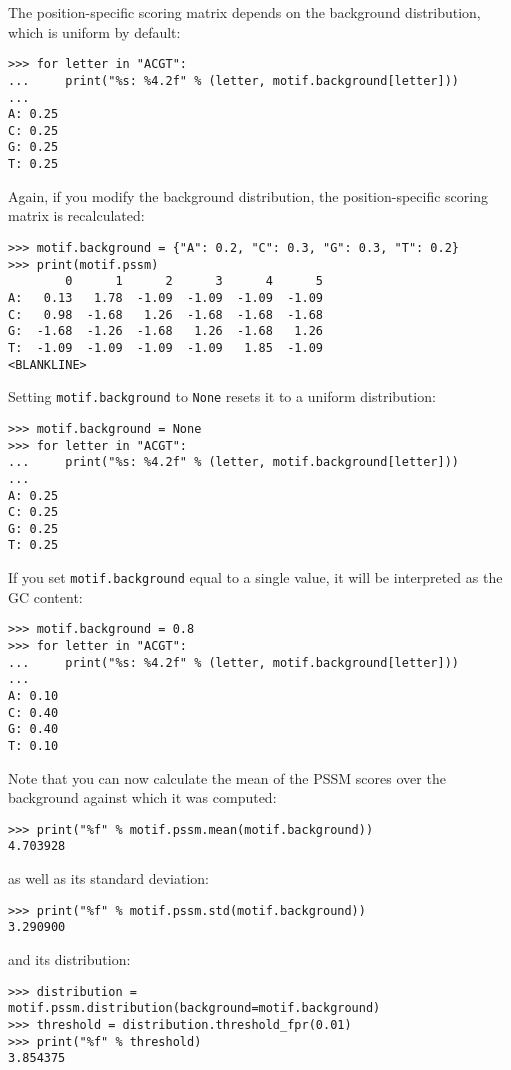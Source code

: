 The position-specific scoring matrix depends on the background distribution, which is uniform by default:

\begin{verbatim}
>>> for letter in "ACGT":
...     print("%s: %4.2f" % (letter, motif.background[letter]))
...
A: 0.25
C: 0.25
G: 0.25
T: 0.25
\end{verbatim}
Again, if you modify the background distribution, the position-specific scoring matrix is recalculated:

\begin{verbatim}
>>> motif.background = {"A": 0.2, "C": 0.3, "G": 0.3, "T": 0.2}
>>> print(motif.pssm)
        0      1      2      3      4      5
A:   0.13   1.78  -1.09  -1.09  -1.09  -1.09
C:   0.98  -1.68   1.26  -1.68  -1.68  -1.68
G:  -1.68  -1.26  -1.68   1.26  -1.68   1.26
T:  -1.09  -1.09  -1.09  -1.09   1.85  -1.09
<BLANKLINE>
\end{verbatim}
Setting \verb+motif.background+ to \verb+None+ resets it to a uniform distribution:

\begin{verbatim}
>>> motif.background = None
>>> for letter in "ACGT":
...     print("%s: %4.2f" % (letter, motif.background[letter]))
...
A: 0.25
C: 0.25
G: 0.25
T: 0.25
\end{verbatim}
If you set \verb+motif.background+ equal to a single value, it will be interpreted as the GC content:

\begin{verbatim}
>>> motif.background = 0.8
>>> for letter in "ACGT":
...     print("%s: %4.2f" % (letter, motif.background[letter]))
...
A: 0.10
C: 0.40
G: 0.40
T: 0.10
\end{verbatim}
Note that you can now calculate the mean of the PSSM scores over the background against which it was computed:

\begin{verbatim}
>>> print("%f" % motif.pssm.mean(motif.background))
4.703928
\end{verbatim}
as well as its standard deviation:

\begin{verbatim}
>>> print("%f" % motif.pssm.std(motif.background))
3.290900
\end{verbatim}
and its distribution:

\begin{verbatim}
>>> distribution = motif.pssm.distribution(background=motif.background)
>>> threshold = distribution.threshold_fpr(0.01)
>>> print("%f" % threshold)
3.854375
\end{verbatim}

